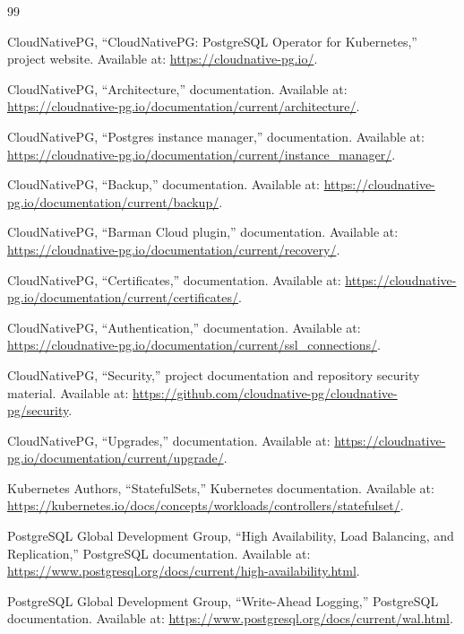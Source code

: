 \documentclass[11pt,a4paper]{article}
\begin{document}
\begin{thebibliography}{99}

CloudNativePG, ``CloudNativePG: PostgreSQL Operator for Kubernetes,'' project website. Available at: \url{https://cloudnative-pg.io/}.

CloudNativePG, ``Architecture,'' documentation. Available at: \url{https://cloudnative-pg.io/documentation/current/architecture/}.

CloudNativePG, ``Postgres instance manager,'' documentation. Available at: \url{https://cloudnative-pg.io/documentation/current/instance_manager/}.

CloudNativePG, ``Backup,'' documentation. Available at: \url{https://cloudnative-pg.io/documentation/current/backup/}.

CloudNativePG, ``Barman Cloud plugin,'' documentation. Available at: \url{https://cloudnative-pg.io/documentation/current/recovery/}.

CloudNativePG, ``Certificates,'' documentation. Available at: \url{https://cloudnative-pg.io/documentation/current/certificates/}.

CloudNativePG, ``Authentication,'' documentation. Available at: \url{https://cloudnative-pg.io/documentation/current/ssl_connections/}.

CloudNativePG, ``Security,'' project documentation and repository security material. Available at: \url{https://github.com/cloudnative-pg/cloudnative-pg/security}.

CloudNativePG, ``Upgrades,'' documentation. Available at: \url{https://cloudnative-pg.io/documentation/current/upgrade/}.

Kubernetes Authors, ``StatefulSets,'' Kubernetes documentation. Available at: \url{https://kubernetes.io/docs/concepts/workloads/controllers/statefulset/}.

PostgreSQL Global Development Group, ``High Availability, Load Balancing, and Replication,'' PostgreSQL documentation. Available at: \url{https://www.postgresql.org/docs/current/high-availability.html}.

PostgreSQL Global Development Group, ``Write-Ahead Logging,'' PostgreSQL documentation. Available at: \url{https://www.postgresql.org/docs/current/wal.html}.


\end{thebibliography}
\end{document}
